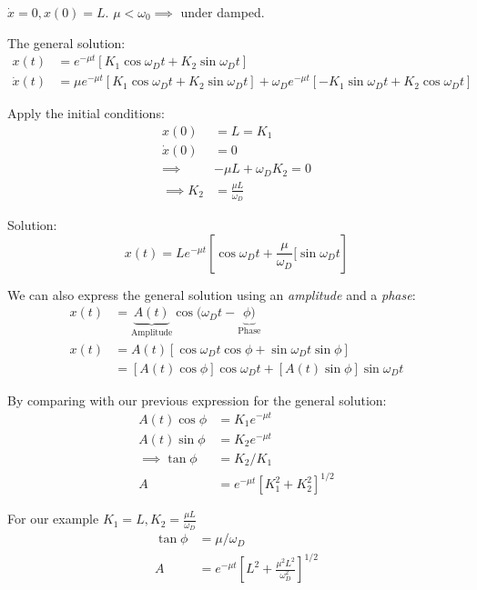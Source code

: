 \documentclass[10pt]{scrartcl}
\begin{document}
\begin{example}

$\dot{x} = 0, x(0) = L$. $\mu < \omega_0 \implies$ under damped.

The general solution:
\[
\begin{aligned}
  x(t) &= e^{-\mu t}[K_1\cos\omega_Dt + K_2\sin\omega_Dt]\\
  \dot{x}(t) &= \mu e^{-\mu t}[K_1\cos\omega_Dt + K_2\sin\omega_Dt] + \omega_De^{-\mu t}[-K_1\sin\omega_Dt + K_2\cos\omega_Dt]
\end{aligned}
\]

Apply the initial conditions:
\[
\begin{aligned}
  x(0) &= L = K_1\\
  \dot{x}(0) &= 0\\
  \implies &-\mu L  + \omega_DK_2 = 0\\
 \implies K_2 &= \frac{\mu L}{\omega_D}
\end{aligned}
\]

Solution: 
\[x(t) = Le^{-\mu t}\left[\cos\omega_Dt + \frac{\mu}{\omega_D}[\sin\omega_Dt\right]\]	
\end{example}

We can also express the general solution using an \emph{amplitude} and a \emph{phase}:
\[
\begin{aligned}
  x(t) &= \underbrace{A(t)}_{\text{Amplitude}}\cos(\omega_Dt - \underbrace{\phi)}_{\text{Phase}}\\
  x(t) &= A(t)[\cos\omega_Dt\cos\phi + \sin\omega_Dt\sin\phi]\\
  &= [A(t)\cos\phi]\cos\omega_Dt + [A(t)\sin\phi]\sin\omega_Dt
\end{aligned}
\]

By comparing with our previous expression for the general solution:
\[
\begin{aligned}
  A(t)\cos\phi &= K_1e^{-\mu t}\\
  A(t)\sin\phi &= K_2e^{-\mu t}\\
  \implies \tan\phi &= K_2/K_1\\
  A &= e^{-\mu t}[K_1^2 + K_2^2]^{1/2}
\end{aligned}
\]

For our example $K_1 = L, K_2 = \frac{\mu L}{\omega_D}$
\[
\begin{aligned}
  \tan\phi &= \mu/\omega_D\\
  A &= e^{-\mu t}\left[L^2 + \frac{\mu^2L^2}{\omega_D^2}\right]^{1/2}
\end{aligned}
\]
\end{document}
